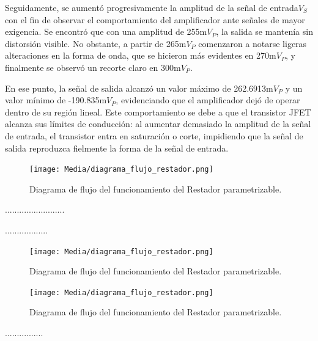 \documentclass[journal]{IEEEtran}
\begin{document}
\par Seguidamente, se aumentó progresivamente la amplitud de la señal de entrada\( V_S \) con el fin de observar el comportamiento del amplificador ante señales de mayor exigencia. Se encontró que con una amplitud de 255m\( V_P \), la salida se mantenía sin distorsión visible. No obstante, a partir de 265m\( V_P \) comenzaron a notarse ligeras alteraciones en la forma de onda, que se hicieron más evidentes en 270m\( V_P \), y finalmente se observó un recorte claro en 300m\( V_P \). 
\par En ese punto, la señal de salida alcanzó un valor máximo de 262.6913m\( V_P \) y un valor mínimo de -190.835m\( V_P \), evidenciando que el amplificador dejó de operar dentro de su región lineal. Este comportamiento se debe a que el transistor JFET alcanza sus límites de conducción: al aumentar demasiado la amplitud de la señal de entrada, el transistor entra en saturación o corte, impidiendo que la señal de salida reproduzca fielmente la forma de la señal de entrada.




\begin{figure}[H]
    \centering
    \texttt{[image: Media/diagrama\_flujo\_restador.png]}
    \caption{Diagrama de flujo del funcionamiento del Restador parametrizable.}
    \label{fig:diagrama_flujo_restador}
\end{figure}

\par .........................
\par ..................


\begin{figure}[H]
    \centering
    \texttt{[image: Media/diagrama\_flujo\_restador.png]}
    \caption{Diagrama de flujo del funcionamiento del Restador parametrizable.}
    \label{fig:diagrama_flujo_restador}
\end{figure}

\begin{figure}[H]
    \centering
    \texttt{[image: Media/diagrama\_flujo\_restador.png]}
    \caption{Diagrama de flujo del funcionamiento del Restador parametrizable.}
    \label{fig:diagrama_flujo_restador}
\end{figure}

\par ................ 
\end{document}

